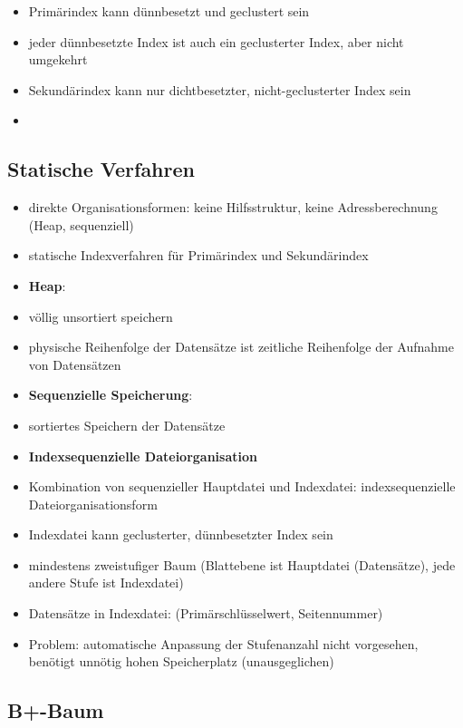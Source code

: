 \documentclass{scrartcl}
\begin{document}
\begin{itemize}
	\itemsep0em
	\item Primärindex kann dünnbesetzt und geclustert sein
	\item jeder dünnbesetzte Index ist auch ein geclusterter Index, aber nicht umgekehrt
	\item Sekundärindex kann nur dichtbesetzter, nicht-geclusterter Index sein
	\item[] %
\end{itemize}

\subsection{Statische Verfahren}

\begin{itemize}
	\itemsep0em
	\item direkte Organisationsformen: keine Hilfsstruktur, keine Adressberechnung (Heap, sequenziell)
	\item statische Indexverfahren für Primärindex und Sekundärindex
	\item[] \textbf{Heap}:
	\item völlig unsortiert speichern
	\item physische Reihenfolge der Datensätze ist zeitliche Reihenfolge der Aufnahme von Datensätzen
	\item[] \textbf{Sequenzielle Speicherung}:
	\item sortiertes Speichern der Datensätze
	\item[] \textbf{Indexsequenzielle Dateiorganisation}
	\item Kombination von sequenzieller Hauptdatei und Indexdatei: indexsequenzielle Dateiorganisationsform
	\item Indexdatei kann geclusterter, dünnbesetzter Index sein
	\item mindestens zweistufiger Baum (Blattebene ist Hauptdatei (Datensätze), jede andere Stufe ist Indexdatei)
	\item Datensätze in Indexdatei: (Primärschlüsselwert, Seitennummer)
	\item Problem:  automatische Anpassung der Stufenanzahl nicht vorgesehen, benötigt unnötig hohen Speicherplatz (unausgeglichen)
\end{itemize}

\subsection{B+-Baum}
\end{document}
